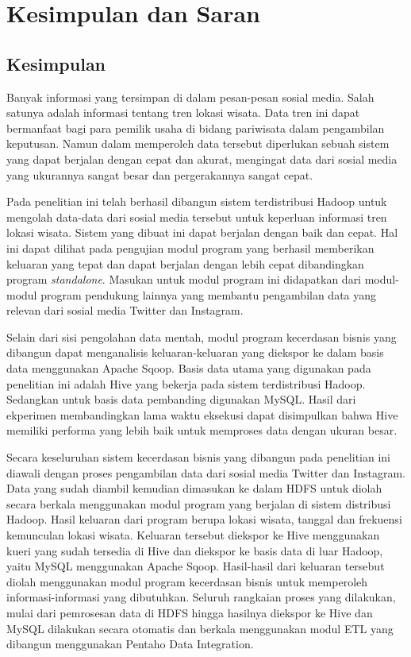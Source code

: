 \chapter{Kesimpulan dan Saran}

\section{Kesimpulan}
Banyak informasi yang tersimpan di dalam pesan-pesan sosial media. Salah satunya adalah informasi tentang tren lokasi wisata. Data tren ini dapat bermanfaat bagi para pemilik usaha di bidang pariwisata dalam pengambilan keputusan. Namun dalam memperoleh data tersebut diperlukan sebuah sistem yang dapat berjalan dengan cepat dan akurat, mengingat data dari sosial media yang ukurannya sangat besar dan pergerakannya sangat cepat. 

Pada penelitian ini telah berhasil dibangun sistem terdistribusi Hadoop untuk mengolah data-data dari sosial media tersebut untuk keperluan informasi tren lokasi wisata. Sistem yang dibuat ini dapat berjalan dengan baik dan cepat. Hal ini dapat dilihat pada pengujian modul program yang berhasil memberikan keluaran yang tepat dan dapat berjalan dengan lebih cepat dibandingkan program \textit{standalone}. Masukan untuk modul program ini didapatkan dari modul-modul program pendukung lainnya yang membantu pengambilan data yang relevan dari sosial media Twitter dan Instagram.

Selain dari sisi pengolahan data mentah, modul program kecerdasan bisnis yang dibangun dapat menganalisis keluaran-keluaran yang diekspor ke dalam basis data menggunakan Apache Sqoop. Basis data utama yang digunakan pada penelitian ini adalah Hive yang bekerja pada sistem terdistribusi Hadoop. Sedangkan untuk basis data pembanding digunakan MySQL. Hasil dari ekperimen membandingkan lama waktu eksekusi dapat disimpulkan bahwa Hive memiliki performa yang lebih baik untuk memproses data dengan ukuran besar.

Secara keseluruhan sistem kecerdasan bisnis yang dibangun pada penelitian ini diawali dengan proses pengambilan data dari sosial media Twitter dan Instagram. Data yang sudah diambil kemudian dimasukan ke dalam HDFS untuk diolah secara berkala menggunakan modul program yang berjalan di sistem distribusi Hadoop. Hasil keluaran dari program berupa lokasi wisata, tanggal dan frekuensi kemunculan lokasi wisata. Keluaran tersebut diekspor ke Hive menggunakan kueri yang sudah tersedia di Hive dan diekspor ke basis data di luar Hadoop, yaitu MySQL menggunakan Apache Sqoop. Hasil-hasil dari keluaran tersebut diolah menggunakan modul program kecerdasan bisnis untuk memperoleh informasi-informasi yang dibutuhkan. Seluruh rangkaian proses yang dilakukan, mulai dari pemrosesan data di HDFS hingga hasilnya diekspor ke Hive dan MySQL dilakukan secara otomatis dan berkala menggunakan modul ETL yang dibangun menggunakan Pentaho Data Integration.

